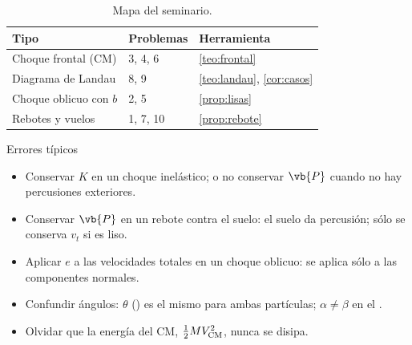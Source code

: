 \begin{table}[!h]
\centering
\caption{Mapa del seminario.}
\label{tab:mapa}
\small
\begin{tabular}{@{}l l l@{}}
\toprule
\color{cian}Tipo & \color{cian}Problemas & \color{cian}Herramienta\\
\midrule
Choque frontal (CM) & 3, 4, 6 & \cref{teo:frontal}\\
Diagrama de Landau & 8, 9 & \cref{teo:landau}, \cref{cor:casos}\\
Choque oblicuo con $b$ & 2, 5 & \cref{prop:lisas}\\
Rebotes y vuelos & 1, 7, 10 & \cref{prop:rebote}\\
\bottomrule
\end{tabular}
\end{table}

\begin{clave}[violeta]{Errores típicos}
\begin{itemize}[leftmargin=1.3em]
  \item Conservar $K$ en un choque inelástico; o no conservar $\vb{P}$ cuando no hay percusiones exteriores.
  \item Conservar $\vb{P}$ en un rebote contra el suelo: el suelo da percusión; sólo se conserva $v_{t}$ si es liso.
  \item Aplicar $e$ a las velocidades totales en un choque oblicuo: se aplica sólo a las componentes normales.
  \item Confundir ángulos: $\theta$ (\scm) es el mismo para ambas partículas; $\alpha\neq\beta$ en el \lab.
  \item Olvidar que la energía del CM, $\tfrac12MV_{\mathrm{CM}}^{2}$, nunca se disipa.
\end{itemize}
\end{clave}
